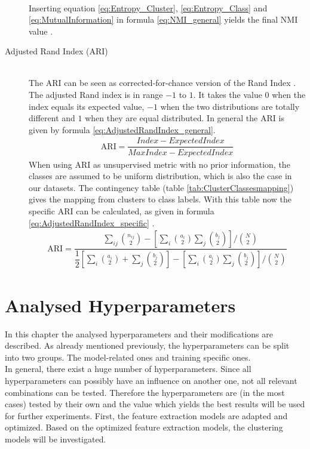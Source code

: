 \documentclass[12pt,DIV14,BCOR12mm,a4paper,footexclude,headinclude,halfparskip-,twoside,openright,cleardoubleempty,idxtotoc,bibtotoc,listtotoc,abstracton]{scrreprt} %
\numberwithin{equation}{chapter}
\begin{document}
\begin{description}
\begin{align}
	\end{align}
	Inserting equation \ref{eq:Entropy_Cluster}, \ref{eq:Entropy_Class} and \ref{eq:MutualInformation} in formula \ref{eq:NMI_general} yields the final NMI value \cite{Vinh10NMI}.
	\item[Adjusted Rand Index (ARI)]\hfill \\
	The ARI can be seen as corrected-for-chance version of the Rand Index \cite{Rand71RandIndex}. The adjusted Rand index is in range $-1$ to $1$. It takes the value $0$ when the index equals its expected value, $-1$ when the two distributions are totally different and $1$ when they are equal distributed. In general the ARI is given by formula \ref{eq:AdjustedRandIndex_general}.
	\begin{align}
		\textrm{ARI} = \dfrac{Index - ExpectedIndex}{MaxIndex - ExpectedIndex}\label{eq:AdjustedRandIndex_general}
	\end{align}
	When using ARI as unsupervised metric with no prior information, the classes are assumed to be uniform distribution, which is also the case in our datasets. The contingency table (table \ref{tab:ClusterClassesmapping}) gives the mapping from clusters to class labels. With this table now the specific ARI can be calculated, as given in formula \ref{eq:AdjustedRandIndex_specific} \cite{Yeung01ARI}.
	\begin{align}
		\textrm{ARI} = \dfrac{\sum_{ij}\binom{n_{ij}}{2}-[\sum_i\binom{a_i}{2}\sum_j\binom{b_j}{2}]/\binom{N}{2}}{\dfrac{1}{2}[\sum_i\binom{a_i}{2}+\sum_j\binom{b_j}{2}]-[\sum_i\binom{a_i}{2}\sum_j\binom{b_j}{2}]/\binom{N}{2}}\label{eq:AdjustedRandIndex_specific}
	\end{align}
\end{description} 
\section{Analysed Hyperparameters}
In this chapter the analysed hyperparameters and their modifications are described. As already mentioned previously, the hyperparameters can be split into two groups. The model-related ones and training specific ones.\\
In general, there exist a huge number of hyperparameters. Since all hyperparameters can possibly have an influence on another one, not all relevant combinations can be tested. Therefore the hyperparameters are (in the most cases) tested by their own and the value which yields the best results will be used for further experiments. First, the feature extraction models are adapted and optimized. Based on the optimized feature extraction models, the clustering models will be investigated.
\end{document}
